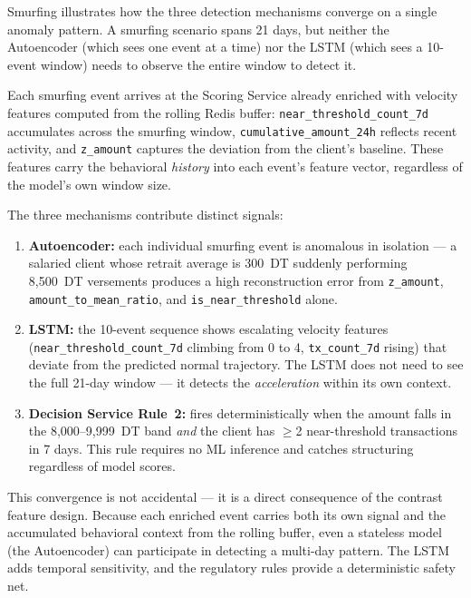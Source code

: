 Smurfing illustrates how the three detection mechanisms converge on a single
anomaly pattern. A smurfing scenario spans 21 days, but neither the
Autoencoder (which sees one event at a time) nor the LSTM (which sees a
10-event window) needs to observe the entire window to detect it.

Each smurfing event arrives at the Scoring Service already enriched with
velocity features computed from the rolling Redis buffer:
\texttt{near\_threshold\_count\_7d} accumulates across the smurfing window,
\texttt{cumulative\_amount\_24h} reflects recent activity, and
\texttt{z\_amount} captures the deviation from the client's baseline. These
features carry the behavioral \textit{history} into each event's feature
vector, regardless of the model's own window size.

The three mechanisms contribute distinct signals:

\begin{enumerate}[leftmargin=2cm]
    \item \textbf{Autoencoder:} each individual smurfing event is anomalous
          in isolation --- a salaried client whose retrait average is 300~DT
          suddenly performing 8,500~DT versements produces a high
          reconstruction error from \texttt{z\_amount},
          \texttt{amount\_to\_mean\_ratio}, and
          \texttt{is\_near\_threshold} alone.

    \item \textbf{LSTM:} the 10-event sequence shows escalating velocity
          features (\texttt{near\_threshold\_count\_7d} climbing from 0 to
          4, \texttt{tx\_count\_7d} rising) that deviate from the predicted
          normal trajectory. The LSTM does not need to see the full 21-day
          window --- it detects the \textit{acceleration} within its own
          context.

    \item \textbf{Decision Service Rule~2:} fires deterministically when
          the amount falls in the 8,000--9,999~DT band \textit{and} the
          client has $\geq$2 near-threshold transactions in 7 days.
          This rule requires no ML inference and catches structuring
          regardless of model scores.
\end{enumerate}

This convergence is not accidental --- it is a direct consequence of the
contrast feature design. Because each enriched event carries both its own
signal and the accumulated behavioral context from the rolling buffer, even
a stateless model (the Autoencoder) can participate in detecting a
multi-day pattern. The LSTM adds temporal sensitivity, and the regulatory
rules provide a deterministic safety net.